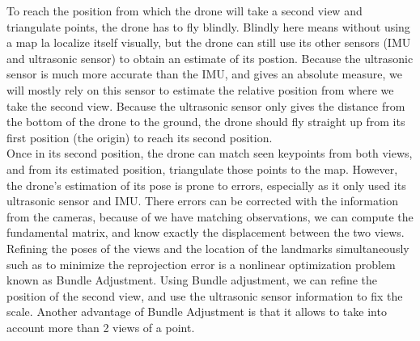
To reach the position from which the drone will take a second view and triangulate points, the drone has to fly blindly. Blindly here means without using a map la localize itself visually, but the drone can still use its other sensors (IMU and ultrasonic sensor) to obtain an estimate of its postion. Because the ultrasonic sensor is much more accurate than the IMU, and gives an absolute measure, we will mostly rely on this sensor to estimate the relative position from where we take the second view. Because the ultrasonic sensor only gives the distance from the bottom of the drone to the ground, the drone should fly straight up from its first position (the origin) to reach its second position.\\
Once in its second position, the drone can match seen keypoints from both views, and from its estimated position, triangulate those points to the map. However, the drone's estimation of its pose is prone to errors, especially as it only used its ultrasonic sensor and IMU. There errors can be corrected with the information from the cameras, because of we have %
matching observations, we can compute the fundamental matrix, and know exactly the displacement between the two views. Refining the poses of the views and the location of the landmarks simultaneously such as to minimize the reprojection error is a nonlinear optimization problem known as Bundle Adjustment. Using Bundle adjustment, we can refine the position of the second view, and use the ultrasonic sensor information to fix the scale. Another advantage of Bundle Adjustment is that it allows to take into account more than 2 views of a point.
